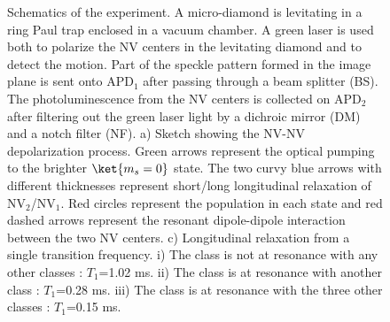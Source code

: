 \documentclass[preprintnumbers,amsmath,amssymb,superscriptaddress,twocolumn,showpacs]{revtex4-1}
\begin{document}
\begin{figure}[!ht]
  \centering {}
  \caption{Schematics of the experiment. A micro-diamond is levitating in a ring Paul trap enclosed in a vacuum chamber. A green laser is used both to polarize the NV centers in the levitating diamond and to detect the motion. Part of the speckle pattern formed in the image plane is sent onto APD$_1$ after passing through a beam splitter (BS). The photoluminescence from the NV centers is collected on APD$_2$ after filtering out the green laser light by a dichroic mirror (DM) and a notch filter (NF). a) Sketch showing the NV-NV depolarization process. Green arrows represent the optical pumping to the brighter $\ket{m_s=0}$ state. The two curvy blue arrows with different thicknesses represent short/long longitudinal relaxation of NV$_2$/NV$_1$. Red circles represent the population in each state and red dashed arrows represent the resonant dipole-dipole interaction between the two NV centers. c) Longitudinal relaxation from a single transition frequency. i) The class is not at resonance with any other classes : $T_1$=1.02 ms. ii) The class is at resonance with another class : $T_1$=0.28 ms. iii) The class is at resonance with the three other classes : $T_1$=0.15 ms.
  }\label{setup}
\end{figure}
\end{document}
